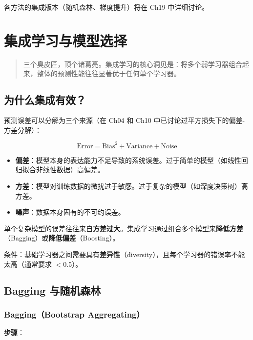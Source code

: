 \documentclass[
]{book}
\providecommand{\tightlist}{%
  \setlength{\itemsep}{0pt}\setlength{\parskip}{0pt}}
\begin{document}
各方法的集成版本（随机森林、梯度提升）将在 Ch19 中详细讨论。

\chapter{集成学习与模型选择}\label{ux96c6ux6210ux5b66ux4e60ux4e0eux6a21ux578bux9009ux62e9}

\begin{quote}
三个臭皮匠，顶个诸葛亮。集成学习的核心洞见是：将多个弱学习器组合起来，整体的预测性能往往显著优于任何单个学习器。
\end{quote}

\section{为什么集成有效？}\label{ux4e3aux4ec0ux4e48ux96c6ux6210ux6709ux6548}

预测误差可以分解为三个来源（在 Ch04 和 Ch10 中已讨论过平方损失下的偏差-方差分解）：

\[\text{Error} = \text{Bias}^2 + \text{Variance} + \text{Noise}\]

\begin{itemize}
\tightlist
\item
  \textbf{偏差}：模型本身的表达能力不足导致的系统误差。过于简单的模型（如线性回归拟合非线性数据）高偏差。
\item
  \textbf{方差}：模型对训练数据的微扰过于敏感。过于复杂的模型（如深度决策树）高方差。
\item
  \textbf{噪声}：数据本身固有的不可约误差。
\end{itemize}

单个复杂模型的误差往往来自\textbf{方差过大}。集成学习通过组合多个模型来\textbf{降低方差}（Bagging）或\textbf{降低偏差}（Boosting）。

条件：基础学习器之间需要具有\textbf{差异性}（diversity），且每个学习器的错误率不能太高（通常要求 \(< 0.5\)）。

\section{Bagging 与随机森林}\label{bagging-ux4e0eux968fux673aux68eeux6797}

\subsection{Bagging（Bootstrap Aggregating）}\label{baggingbootstrap-aggregating}

\textbf{步骤}：
\end{document}
